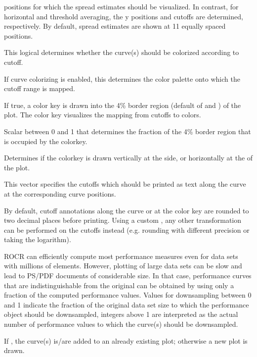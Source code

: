 \begin{Arguments}
\begin{ldescription}
positions for which the spread estimates should be
visualized. In contrast, for horizontal and threshold averaging, the
y positions and cutoffs are determined, respectively. By default,
spread estimates are shown at 11 equally spaced positions.
\item[\code{colorize}] This logical determines whether the curve(s) should be
colorized according to cutoff.
\item[\code{colorize.palette}] If curve colorizing is enabled, this determines the
color palette onto which the cutoff range is mapped.
\item[\code{colorkey}] If true, a color key is drawn into the 4\% border
region (default of  and ) of the
plot. The color key visualizes the mapping from cutoffs to colors.
\item[\code{colorkey.relwidth}] Scalar between 0 and 1 that determines the
fraction of the 4\% border region that is occupied by the colorkey.
\item[\code{colorkey.pos}] Determines if the colorkey is drawn vertically at
the  side, or horizontally at the  of the
plot.
\item[\code{print.cutoffs.at}] This vector specifies the cutoffs which should
be printed as text along the curve at the corresponding curve positions.
\item[\code{cutoff.label.function}] By default, cutoff annotations along the
curve or at the color key are rounded to two decimal places
before printing. Using a custom , any other 
transformation can be performed on the cutoffs instead (e.g. rounding with
different precision or taking the logarithm).
\item[\code{downsampling}] ROCR can efficiently compute most performance measures
even for data sets with millions of elements. However, plotting of
large data sets can be slow and lead to PS/PDF documents of
considerable size. In that case, performance curves that are
indistinguishable from the original can be obtained by using only a
fraction of the computed performance values. Values for downsampling
between 0 and 1 indicate the fraction of the original data set size to which
the performance object should be downsampled, integers above
1 are interpreted as the actual number of performance values to which the
curve(s) should be downsampled.
\item[\code{add}] If , the curve(s) is/are added to an already
existing plot; otherwise a new plot is drawn.
\end{ldescription}
\end{Arguments}
